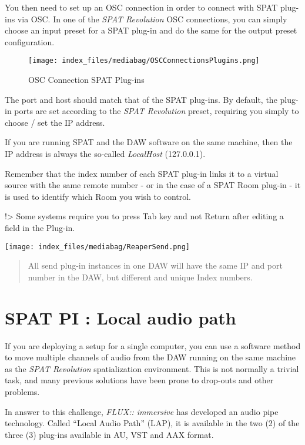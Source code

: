 \documentclass[
  letterpaper,
  DIV=11,
  numbers=noendperiod]{scrreport}
\begin{document}
You then need to set up an OSC connection in order to connect with SPAT
plug-ins via OSC. In one of the \emph{SPAT Revolution} OSC connections,
you can simply choose an input preset for a SPAT plug-in and do the same
for the output preset configuration.

\begin{figure}

{\centering \texttt{[image: index\_files/mediabag/OSCConnectionsPlugins.png]}

}

\caption{OSC Connection SPAT Plug-ins}

\end{figure}

The port and host should match that of the SPAT plug-ins. By default,
the plug-in ports are set according to the \emph{SPAT Revolution}
preset, requiring you simply to choose / set the IP address.

If you are running SPAT and the DAW software on the same machine, then
the IP address is always the so-called \emph{LocalHost} (127.0.0.1).

Remember that the index number of each SPAT plug-in links it to a
virtual source with the same remote number - or in the case of a SPAT
Room plug-in - it is used to identify which Room you wish to control.

!\textgreater{} Some systems require you to press Tab key and not Return
after editing a field in the Plug-in.

\texttt{[image: index\_files/mediabag/ReaperSend.png]}

\begin{quote}
All send plug-in instances in one DAW will have the same IP and port
number in the DAW, but different and unique Index numbers.
\end{quote}

\hypertarget{spat-pi-local-audio-path}{%
\chapter{SPAT PI : Local audio path}\label{spat-pi-local-audio-path}}

If you are deploying a setup for a single computer, you can use a
software method to move multiple channels of audio from the DAW running
on the same machine as the \emph{SPAT Revolution} spatialization
environment. This is not normally a trivial task, and many previous
solutions have been prone to drop-outs and other problems.

In answer to this challenge, \emph{FLUX:: immersive} has developed an
audio pipe technology. Called ``Local Audio Path'' (LAP), it is
available in the two (2) of the three (3) plug-ins available in AU, VST
and AAX format.
\end{document}
